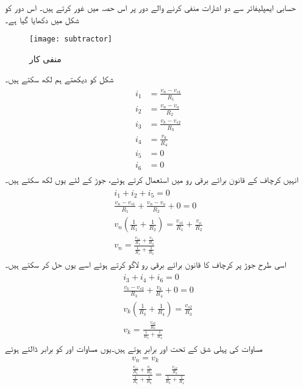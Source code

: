 
حسابی ایمپلیفائر سے دو اشارات منفی کرنے والے دور پر اس حصہ میں غور کرتے ہیں۔ اس دور کو شکل  میں دکھایا گیا ہے۔
\begin{figure}
\centering
\texttt{[image: subtractor]}
\caption{منفی کار}
\label{شکل_منفی_کار}
\end{figure}
شکل کو دیکھتے ہم لکھ سکتے ہیں۔
\begin{gather}
\begin{aligned}
i_1 &= \frac{v_n-v_{s1}}{R_1}\\
i_2&=\frac{v_n-v_o}{R_2}\\
i_3&=\frac{v_k-v_{s2}}{R_3}\\
i_4&=\frac{v_k}{R_4}\\
i_5&=0\\
i_6&=0
\end{aligned}
\end{gather}
انہیں کرچاف کے قانون برائے برقی رو میں  استعمال کرتے ہوئے، جوڑ   کے لئے یوں لکھ سکتے ہیں۔
\begin{gather} \label{مساوات_منفی_کار_منفی_سرے_پر_دباو}
\begin{aligned}
 i_1+i_2+i_5=0\\
\frac{v_n-v_{s1}}{R_1}+\frac{v_n-v_o}{R_2}+0=0\\
v_n \left(\frac{1}{R_1}+\frac{1}{R_2} \right)=\frac{v_{s1}}{R_1}+\frac{v_o}{R_2}\\
v_n=\frac{\frac{v_{s1}}{R_1}+\frac{v_o}{R_2}}{\frac{1}{R_1}+\frac{1}{R_2}}
\end{aligned}
\end{gather}
اسی طرح جوڑ   پر کرچاف کا قانون برائے برقی رو لاگو کرتے ہوئے اسے یوں حل کر سکتے ہیں۔
\begin{gather} \label{مساوات_منفی_کار_مثبت_سرے_پر_دباو}
\begin{aligned}
i_3+i_4+i_6=0\\
\frac{v_k-v_{s2}}{R_3}+\frac{v_k}{R_4}+0=0\\
v_k \left(\frac{1}{R_3}+\frac{1}{R_4} \right)=\frac{v_{s2}}{R_3}\\
v_k=\frac{\frac{v_{s2}}{R_3}}{\frac{1}{R_3}+\frac{1}{R_4} }
\end{aligned}
\end{gather}
مساوات  کی پہلی شق کے تحت   اور  برابر ہوتے ہیں۔یوں مساوات   اور   کو برابر ڈالتے ہوئے
\begin{align*}
v_n=v_k\\
\frac{\frac{v_{s1}}{R_1}+\frac{v_o}{R_2}}{\frac{1}{R_1}+\frac{1}{R_2}}=\frac{\frac{v_{s2}}{R_3}}{\frac{1}{R_3}+\frac{1}{R_4} }
\end{align*}
